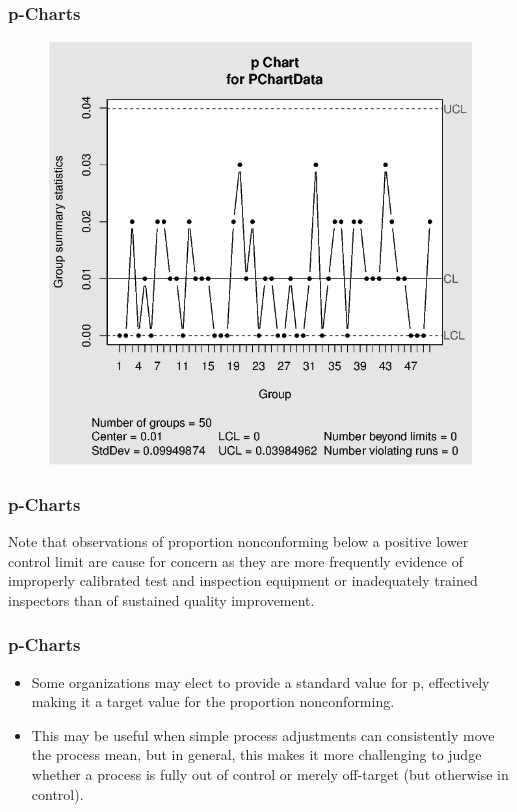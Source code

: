 \documentclass[Charts101.tex]{subfiles}
\begin{document}
\begin{frame}
	\frametitle{p-Charts}
	
\begin{figure}
\centering
\includegraphics[width=0.99\linewidth]{p-charts}
\caption{}
\label{fig:p-charts}
\end{figure}

\end{frame}
\begin{frame}
	\frametitle{p-Charts}
	\Large

Note that observations of proportion nonconforming below a positive lower control limit are cause for concern as they are more frequently evidence of improperly calibrated test and inspection equipment or inadequately trained inspectors than of sustained quality improvement.

\end{frame}
\begin{frame}
	\frametitle{p-Charts}
	\Large
\begin{itemize}
\item Some organizations may elect to provide a standard value for p, effectively making it a target value for the proportion nonconforming. \item This may be useful when simple process adjustments can consistently move the process mean, but in general, this makes it more challenging to judge whether a process is fully out of control or merely off-target (but otherwise in control).
\end{itemize}


\end{frame}
\end{document}

